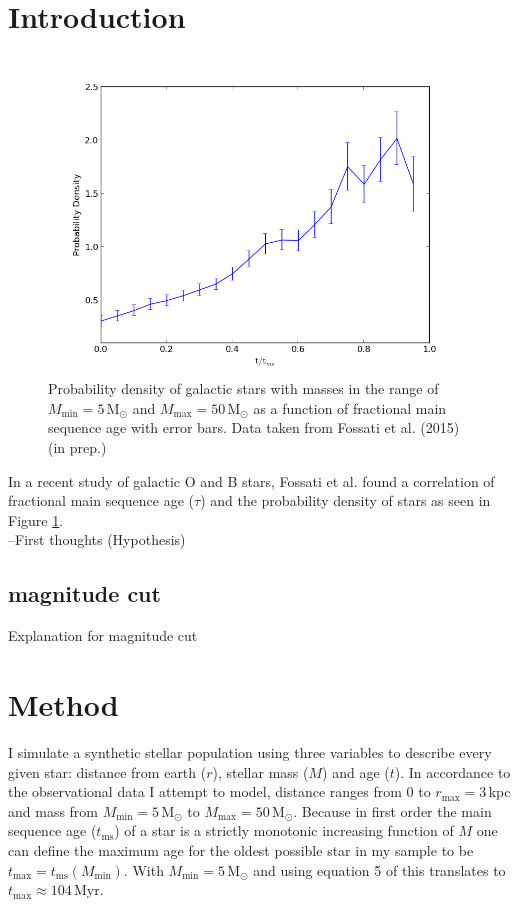 \documentclass[a4paper,10pt]{article}
\date{03/15/15}
\begin{document}
 \section{Introduction}
 \begin{figure}[h!]
  \includegraphics[width=\textwidth]{obsdata}
  \caption{Probability density of galactic stars with masses in the range of $M_{\mathrm{min}}=5\,$M$_{\odot}$ and 
  $M_{\mathrm{max}}=50\,$M$_\odot$ as a function of fractional main sequence age with error bars. Data taken from Fossati et al. (2015) 
  (in prep.)\label{obsdata}}
 \end{figure}

 In a recent study of galactic O and B stars, Fossati et al. found a correlation of fractional main sequence age ($\tau$) and
 the probability density of stars as seen in Figure \ref{obsdata}.  \\
 --First thoughts (Hypothesis)\\
 \subsection{magnitude cut}
 Explanation for magnitude cut \label{magnitudecut}
 \section{Method}
 
 I simulate a synthetic stellar population using three variables to describe every given star: distance from earth ($r$), stellar mass ($M$) 
 and age ($t$). In accordance to the observational data I attempt to model, distance ranges from 0 to $r_{\mathrm{max}}=3\,$kpc and mass
 from $M_{\mathrm{min}}=5\,\mathrm{M}_\odot$ to $M_{\mathrm{max}}=50\,\mathrm{M}_\odot$. Because in first order the main sequence age 
 ($t_{\mathrm{ms}}$) of 
 a star is a strictly monotonic increasing function of $M$ one can define the maximum age for the oldest possible star in my sample to be
 $t_{\mathrm{max}}=t_{\mathrm{ms}}(M_{\mathrm{min}})$. With $M_{\mathrm{min}}=5\,\mathrm{M}_\odot$ and using equation 5 of 
 \citep*{2000MNRAS.315..543H} this translates to $t_{\mathrm{max}}\approx 104\,\mathrm{Myr}$.\\
 
\end{document}
